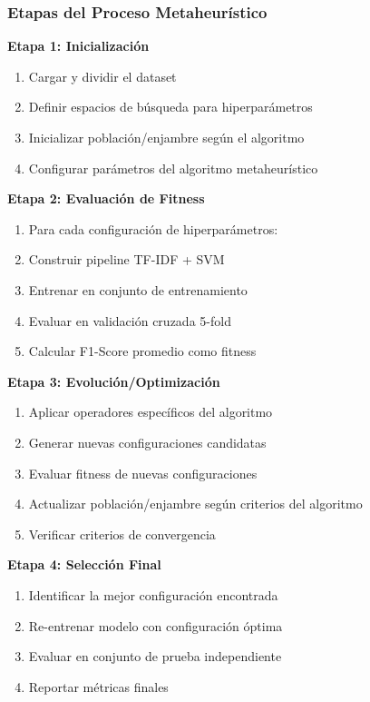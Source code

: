 \subsubsection{Etapas del Proceso Metaheurístico}

\textbf{Etapa 1: Inicialización}
\begin{enumerate}
    \item Cargar y dividir el dataset
    \item Definir espacios de búsqueda para hiperparámetros
    \item Inicializar población/enjambre según el algoritmo
    \item Configurar parámetros del algoritmo metaheurístico
\end{enumerate}

\textbf{Etapa 2: Evaluación de Fitness}
\begin{enumerate}
    \item Para cada configuración de hiperparámetros:
    \item \quad Construir pipeline TF-IDF + SVM
    \item \quad Entrenar en conjunto de entrenamiento
    \item \quad Evaluar en validación cruzada 5-fold
    \item \quad Calcular F1-Score promedio como fitness
\end{enumerate}

\textbf{Etapa 3: Evolución/Optimización}
\begin{enumerate}
    \item Aplicar operadores específicos del algoritmo
    \item Generar nuevas configuraciones candidatas
    \item Evaluar fitness de nuevas configuraciones
    \item Actualizar población/enjambre según criterios del algoritmo
    \item Verificar criterios de convergencia
\end{enumerate}

\textbf{Etapa 4: Selección Final}
\begin{enumerate}
    \item Identificar la mejor configuración encontrada
    \item Re-entrenar modelo con configuración óptima
    \item Evaluar en conjunto de prueba independiente
    \item Reportar métricas finales
\end{enumerate}

